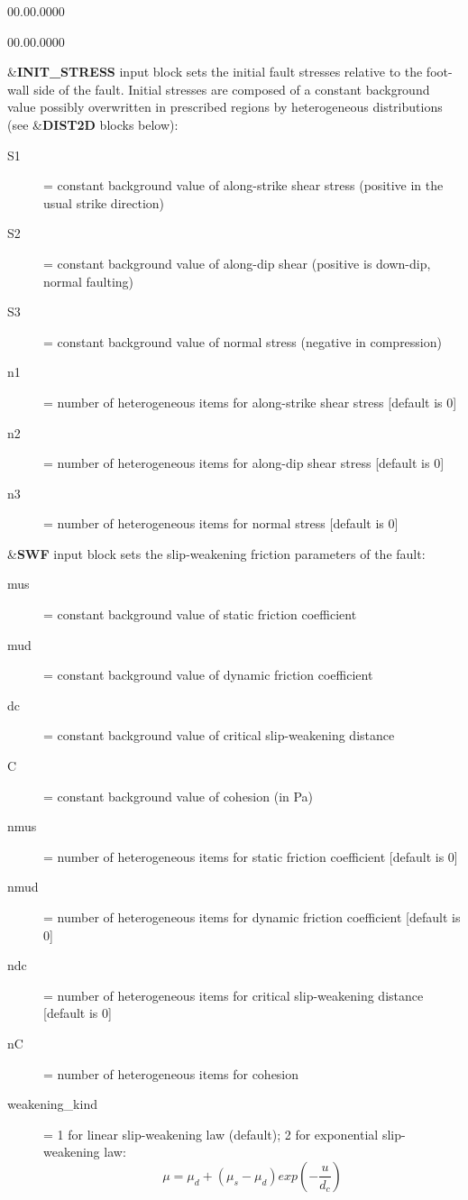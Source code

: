 \begin{lyxlist}{00.00.0000}
\begin{lyxlist}{00.00.0000}
\item [{\&\textbf{INIT\_STRESS}}] input block sets the initial fault stresses
relative to the foot-wall side of the fault. Initial stresses are
composed of a constant background value possibly overwritten in prescribed
regions by heterogeneous distributions (see \&\textbf{DIST2D} blocks
below):
\begin{description}
\item [{S1}] = constant background value of along-strike shear stress (positive
in the usual strike direction)
\item [{S2}] = constant background value of along-dip shear (positive is
down-dip, normal faulting)
\item [{S3}] = constant background value of normal stress (negative in
compression)
\item [{n1}] = number of heterogeneous items for along-strike shear stress
{[}default is 0{]}
\item [{n2}] = number of heterogeneous items for along-dip shear stress
{[}default is 0{]}
\item [{n3}] = number of heterogeneous items for normal stress {[}default
is 0{]}
\end{description}

\item [{\&\textbf{SWF}}] input block sets the slip-weakening friction parameters
of the fault:
\begin{description}
\item [{mus}] = constant background value of static friction coefficient
\item [{mud}] = constant background value of dynamic friction coefficient
\item [{dc}] = constant background value of critical slip-weakening distance
\item [{C}] = constant background value of cohesion (in Pa)
\item [{nmus}] = number of heterogeneous items for static friction coefficient
{[}default is 0{]}
\item [{nmud}] = number of heterogeneous items for dynamic friction coefficient
{[}default is 0{]}
\item [{ndc}] = number of heterogeneous items for critical slip-weakening
distance {[}default is 0{]}
\item [{nC}] = number of heterogeneous items for cohesion
\item [{weakening\_kind}] = 1 for linear slip-weakening law (default); 2 for exponential slip-weakening law:
                            $$\mu = \mu_d + (\mu_s-\mu_d) exp(-\frac{u}{d_c}) $$
\end{description}


\end{lyxlist}
\end{lyxlist}
